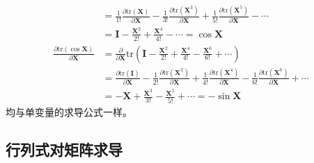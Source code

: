 \documentclass{ctexart}
\theoremstyle{definition}
\def \Iv {\mathbf{I}}
\def \Xv {\mathbf{X}}
\def \tr {\mathrm{tr}}
\begin{document}
\begin{itemize}
\begin{align*}
                                                          & = \frac{1}{1!} \frac{\partial \tr (\Xv)}{\partial \Xv} - \frac{1}{3!} \frac{\partial \tr (\Xv^3)}{\partial \Xv} + \frac{1}{5!} \frac{\partial \tr (\Xv^5)}{\partial \Xv} - \cdots                                             \\
                                                          & = \Iv - \frac{\Xv^2}{2!} + \frac{\Xv^4}{4!} - \cdots = \cos \Xv                                                                                                                                                               \\
              \frac{\partial \tr(\cos \Xv)}{\partial \Xv} & = \frac{\partial }{\partial \Xv} \tr \left( \Iv - \frac{\Xv^2}{2!} + \frac{\Xv^4}{4!} - \frac{\Xv^6}{6!} + \cdots \right)                                                                                                     \\
                                                          & = \frac{\partial \tr (\Iv)}{\partial \Xv} - \frac{1}{2!} \frac{\partial \tr (\Xv^2)}{\partial \Xv} + \frac{1}{4!} \frac{\partial \tr (\Xv^4)}{\partial \Xv} - \frac{1}{6!} \frac{\partial \tr (\Xv^6)}{\partial \Xv} + \cdots \\
                                                          & = - \Xv + \frac{\Xv^3}{3!} - \frac{\Xv^5}{5!} + \cdots = - \sin \Xv
          \end{align*}
          均与单变量的求导公式一样。
\end{itemize}

\subsection{行列式对矩阵求导}
\end{document}
